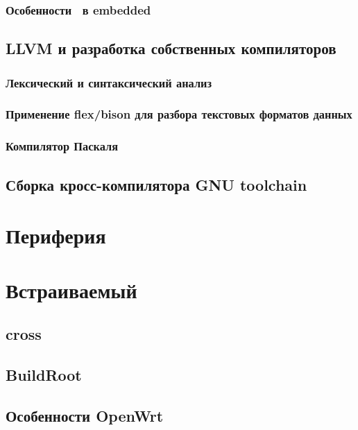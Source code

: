 \section{Особенности \cpp\ в embedded}

\chapter{LLVM и разработка собственных компиляторов}

\section{Лексический и синтаксический анализ}

\section{Применение flex/bison для разбора текстовых форматов данных}

\section{Компилятор Паскаля}

\chapter{Сборка кросс-компилятора GNU toolchain}



\part{Периферия}

\part{Встраиваемый \emlinux}

\chapter{cross}

\chapter{BuildRoot}

\chapter{Особенности OpenWrt}


